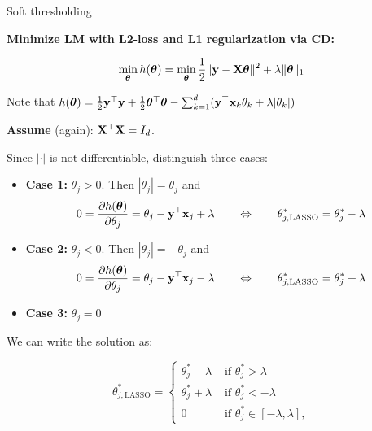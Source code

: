 \documentclass[11pt,compress,t,notes=noshow, xcolor=table]{beamer}
\begin{document}
\begin{vbframe}{Soft thresholding}

\textbf{Minimize LM with L2-loss and L1 regularization via CD:}

\begin{equation*}
    \min_{\thetab} h(\thetab) = \min_{\thetab} \frac{1}{2}\|\yv - \Xmat \thetab\|^2 + \lambda \|\thetab\|_1 %
\end{equation*}

Note that $h(\bm{\theta}) = \frac{1}{2}\mathbf{y}^\top \mathbf{y} + \frac{1}{2}\bm{\theta}^\top \bm{\theta}  - \sum_{k = 1}^d (\mathbf{y}^\top \mathbf{x}_k \theta_k + \lambda|\theta_k|)$

\medskip

\textbf{Assume} (again): $\mathbf{X}^\top \mathbf{X} = I_d$.

Since $|\cdot|$ is not differentiable, distinguish three cases:

\medskip

\begin{footnotesize}
    \begin{itemize}
        \item \textbf{Case 1:} $\theta_j > 0$.
            Then $|\theta_j| = \theta_j$ and 
            \begin{equation*}
                0 = \frac{\partial{h}(\bm{\theta})}{\partial \theta_j} = \theta_j - \mathbf{y}^\top \mathbf{x}_j + \lambda \qquad \Leftrightarrow \qquad \theta^\ast_{j, \text{LASSO}} = \theta^\ast_j - \lambda        
            \end{equation*}
        \item \textbf{Case 2:} $\theta_j < 0$.
            Then $|\theta_j| = - \theta_j$ and 
            \begin{equation*}
                0 = \frac{\partial{h}(\bm{\theta})}{\partial \theta_j} = \theta_j - \mathbf{y}^\top \mathbf{x}_j - \lambda \qquad \Leftrightarrow \qquad \theta^\ast_{j, \text{LASSO}} = \theta^\ast_j + \lambda
                \end{equation*}
        \item \textbf{Case 3:} $\theta_j = 0$
    \end{itemize}
\end{footnotesize}

We can write the solution as: 

\begin{equation*}
    \theta^\ast_{j, \text{LASSO}} =
    \begin{cases}
        \theta^\ast_j - \lambda & \text{ if } \theta^\ast_j > \lambda \\
        \theta^\ast_j + \lambda & \text{ if } \theta^\ast_j < - \lambda \\
        0 &  \text{ if }  \theta^\ast_j \in [- \lambda, \lambda],
    \end{cases}
\end{equation*}


\end{vbframe}
\end{document}
